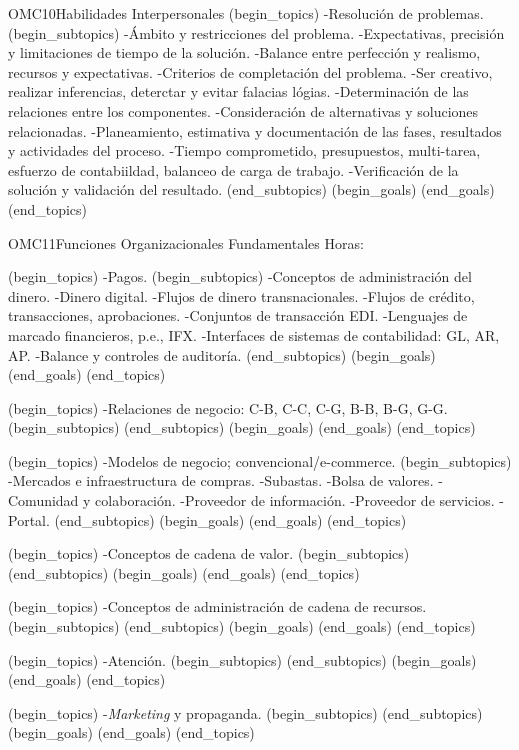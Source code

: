 \begin{BKL2}{OMC10}{Habilidades Interpersonales}
(begin_topics)
-Resolución de problemas.
(begin_subtopics)
-Ámbito y restricciones del problema.
-Expectativas, precisión y limitaciones de tiempo de la solución.
-Balance entre perfección y realismo, recursos y expectativas.
-Criterios de completación del problema.
-Ser creativo, realizar inferencias, deterctar y evitar falacias lógias.
-Determinación de las relaciones entre los componentes.
-Consideración de alternativas y soluciones relacionadas.
-Planeamiento, estimativa y documentación de las fases, resultados y actividades del proceso.
-Tiempo comprometido, presupuestos, multi-tarea, esfuerzo de contabiildad, balanceo de carga de trabajo.
-Verificación de la solución y validación del resultado.
(end_subtopics)
(begin_goals)
(end_goals)
(end_topics)
\end{BKL2}

\begin{BKL2}{OMC11}{Funciones Organizacionales Fundamentales}
Horas:
 
(begin_topics)
-Pagos.
(begin_subtopics)
-Conceptos de administración del dinero.
-Dinero digital.
-Flujos de dinero transnacionales.
-Flujos de crédito, transacciones, aprobaciones.
-Conjuntos de transacción EDI.
-Lenguajes de marcado financieros, p.e., IFX.
-Interfaces de sistemas de contabilidad: GL, AR, AP.
-Balance y controles de auditoría.
(end_subtopics)
(begin_goals)
(end_goals)
(end_topics)

 

(begin_topics)
-Relaciones de negocio: C-B, C-C, C-G, B-B, B-G, G-G.
(begin_subtopics)
(end_subtopics)
(begin_goals)
(end_goals)
(end_topics)

 
(begin_topics)
-Modelos de negocio; convencional/e-commerce.
(begin_subtopics)
-Mercados e infraestructura de compras.
-Subastas.
-Bolsa de valores.
-Comunidad y colaboración.
-Proveedor de información.
-Proveedor de servicios.
-Portal.
(end_subtopics)
(begin_goals)
(end_goals)
(end_topics)

 
(begin_topics)
-Conceptos de cadena de valor.
(begin_subtopics)
(end_subtopics)
(begin_goals)
(end_goals)
(end_topics)

 
(begin_topics)
-Conceptos de administración de cadena de recursos.
(begin_subtopics)
(end_subtopics)
(begin_goals)
(end_goals)
(end_topics)

 
(begin_topics)
-Atención.
(begin_subtopics)
(end_subtopics)
(begin_goals)
(end_goals)
(end_topics)

 
(begin_topics)
-{\it Marketing} y propaganda.
(begin_subtopics)
(end_subtopics)
(begin_goals)
(end_goals)
(end_topics)


\end{BKL2}
